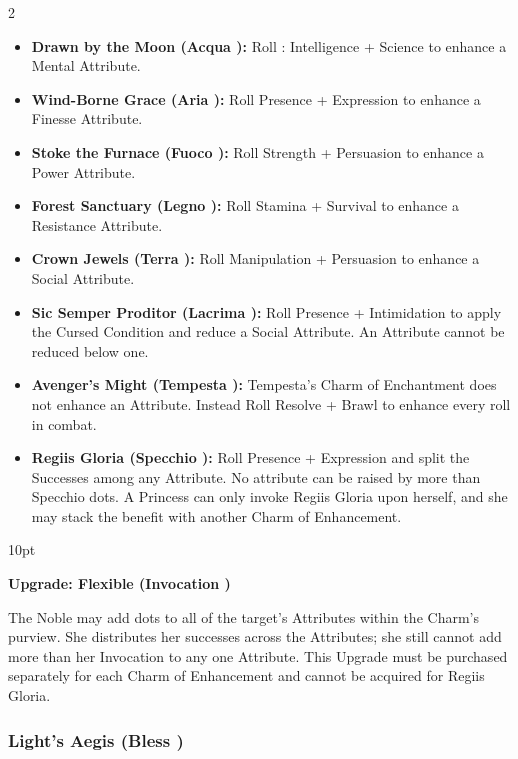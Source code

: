 \begin{multicols}{2}
\begin{itemize}
\item \textbf{Drawn by the Moon (Acqua \textbullet\textbullet):} Roll : Intelligence + Science to enhance a Mental Attribute.
\item \textbf{Wind-Borne Grace (Aria \textbullet\textbullet):} Roll Presence + Expression to enhance a Finesse Attribute. 
\item \textbf{Stoke the Furnace (Fuoco \textbullet\textbullet):} Roll Strength + Persuasion to enhance a Power Attribute.
\item \textbf{Forest Sanctuary (Legno \textbullet\textbullet):} Roll Stamina + Survival to enhance a Resistance Attribute.
\item \textbf{Crown Jewels (Terra \textbullet\textbullet):} Roll Manipulation + Persuasion to enhance a Social Attribute.
\item \textbf{Sic Semper Proditor (Lacrima \textbullet\textbullet):} Roll Presence + Intimidation to apply the Cursed Condition and reduce a Social Attribute. An Attribute cannot be reduced below one.
\item \textbf{Avenger’s Might (Tempesta \textbullet\textbullet):} Tempesta's Charm of Enchantment does not enhance an Attribute. Instead Roll  Resolve + Brawl to enhance every roll in combat. 
\item \textbf{Regiis Gloria (Specchio \textbullet\textbullet\textbullet):} Roll Presence + Expression and split the Successes among any Attribute. No attribute can be raised by more than Specchio dots. A Princess can only invoke Regiis Gloria upon herself, and she may stack the benefit with another Charm of Enhancement.  
\end{itemize}


\begin{myindentpar}{10pt} 

\textbf{Upgrade: Flexible (Invocation \textbullet\textbullet\textbullet)}

The Noble may add dots to all of the target’s Attributes within the Charm's purview. She distributes her successes across the Attributes; she still cannot add more than her Invocation to any one Attribute. This Upgrade must be purchased separately for each Charm of Enhancement and cannot be acquired for Regiis Gloria. 

\end{myindentpar}

\subsubsection*{Light’s Aegis (Bless \textbullet\textbullet\textbullet)}


\end{multicols}
